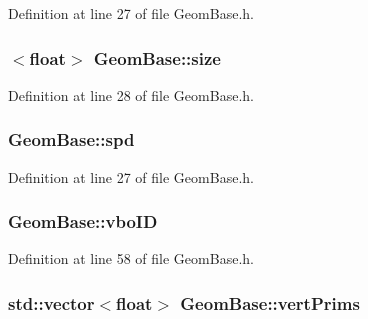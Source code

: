 Definition at line 27 of file Geom\-Base.\-h.

\hypertarget{class_geom_base_a3361cbbc26a1ef9768b1f0216af70bd1}{
\subsubsection[{size}]{$<$float$>$ Geom\-Base\-::size\hspace{0.3cm}{\ttfamily [protected]}}}\label{class_geom_base_a3361cbbc26a1ef9768b1f0216af70bd1}


Definition at line 28 of file Geom\-Base.\-h.

\hypertarget{class_geom_base_a00d3b4512a14c19c818caf93681d36df}{
\subsubsection[{spd}]{ Geom\-Base\-::spd\hspace{0.3cm}{\ttfamily [protected]}}}\label{class_geom_base_a00d3b4512a14c19c818caf93681d36df}


Definition at line 27 of file Geom\-Base.\-h.

\hypertarget{class_geom_base_a9fd2238f1b31b148d70f22a98c6d30b5}{
\subsubsection[{vbo\-I\-D}]{ Geom\-Base\-::vbo\-I\-D\hspace{0.3cm}{\ttfamily [protected]}}}\label{class_geom_base_a9fd2238f1b31b148d70f22a98c6d30b5}


Definition at line 58 of file Geom\-Base.\-h.

\hypertarget{class_geom_base_abb278debe87d4c0882d946d520e24715}{
\subsubsection[{vert\-Prims}]{\setlength{\rightskip}{0pt plus 5cm}std\-::vector$<$float$>$ Geom\-Base\-::vert\-Prims\hspace{0.3cm}{\ttfamily [protected]}}}\label{class_geom_base_abb278debe87d4c0882d946d520e24715}



